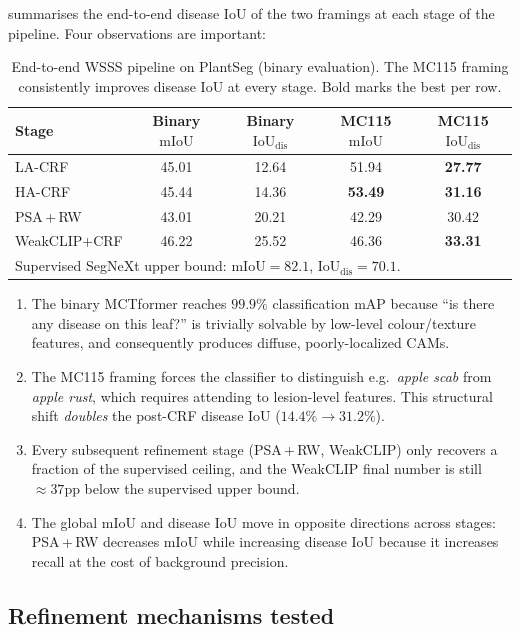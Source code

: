 \documentclass[11pt,a4paper]{article}
\newcommand{\IoU}{\mathrm{IoU}}
\newcommand{\mIoU}{\mathrm{mIoU}}
\begin{document}
 summarises the end-to-end disease IoU of the
two framings at each stage of the pipeline. Four observations are
important:

\begin{table}[t]
\centering
\small
\caption{End-to-end WSSS pipeline on PlantSeg (binary evaluation). The
MC115 framing consistently improves disease IoU at every stage. Bold
marks the best per row.}
\label{tab:wsss_plantseg}
\begin{tabular}{@{}lcccc@{}}
\toprule
Stage & Binary $\mIoU$ & Binary $\IoU_{\mathrm{dis}}$ & MC115 $\mIoU$ & MC115 $\IoU_{\mathrm{dis}}$\\
\midrule
LA-CRF         & 45.01 & 12.64 & 51.94 & \textbf{27.77}\\
HA-CRF         & 45.44 & 14.36 & \textbf{53.49} & \textbf{31.16}\\
PSA\,+\,RW     & 43.01 & 20.21 & 42.29 & 30.42\\
WeakCLIP+CRF   & 46.22 & 25.52 & 46.36 & \textbf{33.31}\\
\bottomrule
\multicolumn{5}{l}{\footnotesize Supervised SegNeXt upper bound: $\mIoU=82.1$, $\IoU_{\mathrm{dis}}=70.1$.}
\end{tabular}
\end{table}

\begin{enumerate}[label=(\arabic*),leftmargin=*,itemsep=2pt]
\item The binary MCTformer reaches $99.9\%$ classification mAP because
``is there any disease on this leaf?'' is trivially solvable by
low-level colour/texture features, and consequently produces diffuse,
poorly-localized CAMs.
\item The MC115 framing forces the classifier to distinguish e.g.\
\emph{apple scab} from \emph{apple rust}, which requires attending to
lesion-level features. This structural shift \emph{doubles} the
post-CRF disease IoU ($14.4\%\to31.2\%$).
\item Every subsequent refinement stage (PSA\,+\,RW, WeakCLIP) only
recovers a fraction of the supervised ceiling, and the
WeakCLIP final number is still ${\approx}37$pp below the supervised
upper bound.
\item The global $\mIoU$ and disease $\IoU$ move in opposite
directions across stages: PSA\,+\,RW decreases $\mIoU$ while increasing
disease IoU because it increases recall at the cost of background
precision.
\end{enumerate}

\subsection{Refinement mechanisms tested}
\end{document}
